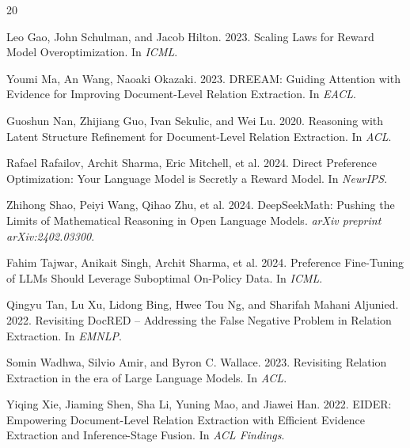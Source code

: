 \documentclass[11pt,a4paper]{article}
\begin{document}
\begin{thebibliography}{20}

Leo Gao, John Schulman, and Jacob Hilton. 2023.
\newblock Scaling Laws for Reward Model Overoptimization.
\newblock In \emph{ICML}.

Youmi Ma, An Wang, Naoaki Okazaki. 2023.
\newblock DREEAM: Guiding Attention with Evidence for Improving Document-Level Relation Extraction.
\newblock In \emph{EACL}.

Guoshun Nan, Zhijiang Guo, Ivan Sekulic, and Wei Lu. 2020.
\newblock Reasoning with Latent Structure Refinement for Document-Level Relation Extraction.
\newblock In \emph{ACL}.

Rafael Rafailov, Archit Sharma, Eric Mitchell, et al. 2024.
\newblock Direct Preference Optimization: Your Language Model is Secretly a Reward Model.
\newblock In \emph{NeurIPS}.

Zhihong Shao, Peiyi Wang, Qihao Zhu, et al. 2024.
\newblock DeepSeekMath: Pushing the Limits of Mathematical Reasoning in Open Language Models.
\newblock \emph{arXiv preprint arXiv:2402.03300}.

Fahim Tajwar, Anikait Singh, Archit Sharma, et al. 2024.
\newblock Preference Fine-Tuning of LLMs Should Leverage Suboptimal On-Policy Data.
\newblock In \emph{ICML}.

Qingyu Tan, Lu Xu, Lidong Bing, Hwee Tou Ng, and Sharifah Mahani Aljunied. 2022.
\newblock Revisiting DocRED -- Addressing the False Negative Problem in Relation Extraction.
\newblock In \emph{EMNLP}.

Somin Wadhwa, Silvio Amir, and Byron C. Wallace. 2023.
\newblock Revisiting Relation Extraction in the era of Large Language Models.
\newblock In \emph{ACL}.

Yiqing Xie, Jiaming Shen, Sha Li, Yuning Mao, and Jiawei Han. 2022.
\newblock EIDER: Empowering Document-Level Relation Extraction with Efficient Evidence Extraction and Inference-Stage Fusion.
\newblock In \emph{ACL Findings}.


\end{thebibliography}
\end{document}
